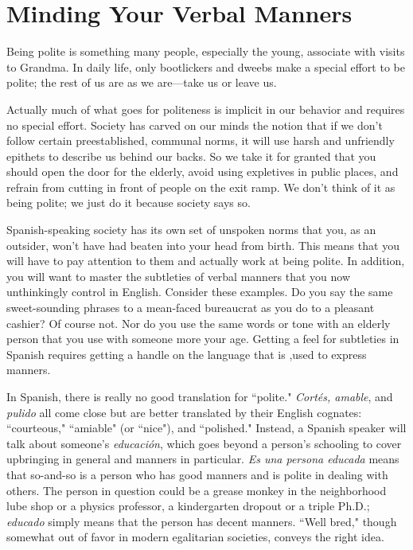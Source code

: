 \chapter{Minding Your Verbal Manners}

Being polite is something many people, especially the young,
associate with visits to Grandma. In daily life, only bootlickers and
dweebs make a special effort to be polite; the rest of us are as we
are---take us or leave us.

Actually much of what goes for politeness is implicit in our
behavior and requires no special effort. Society has carved on our
minds the notion that if we don't follow certain preestablished, communal norms, it will use harsh and unfriendly epithets to describe us
behind our backs. So we take it for granted that you should open the
door for the elderly, avoid using expletives in public places, and refrain
from cutting in front of people on the exit ramp. We don't think of it as
being polite; we just do it because society says so.

Spanish-speaking society has its own set of unspoken norms
that you, as an outsider, won't have had beaten into your head from
birth. This means that you will have to pay attention to them and actually work at being polite. In addition, you will want to master the
subtleties of verbal manners that you now unthinkingly control in English. Consider these examples. Do you say the same sweet-sounding
phrases to a mean-faced bureaucrat as you do to a pleasant cashier? Of
course not. Nor do you use the same words or tone with an elderly
person that you use with someone more your age. Getting a feel for
subtleties in Spanish requires getting a handle on the language that is
,used to express manners.

In Spanish, there is really no good translation for ``polite."
\emph{Cortés, amable}, and \emph{pulido} all come close but are better translated by
their English cognates: ``courteous," ``amiable" (or ``nice"), and ``polished." Instead, a Spanish speaker will talk about someone's \emph{educación}, which goes beyond a person's schooling to cover upbringing in
general and manners in particular. \emph{Es una persona educada} means that
so-and-so is a person who has good manners and is polite in dealing
with others. The person in question could be a grease monkey in the
neighborhood lube shop or a physics professor, a kindergarten dropout
or a triple Ph.D.; \emph{educado} simply means that the person has decent
manners. ``Well bred," though somewhat out of favor in modern egalitarian societies, conveys the right idea.

